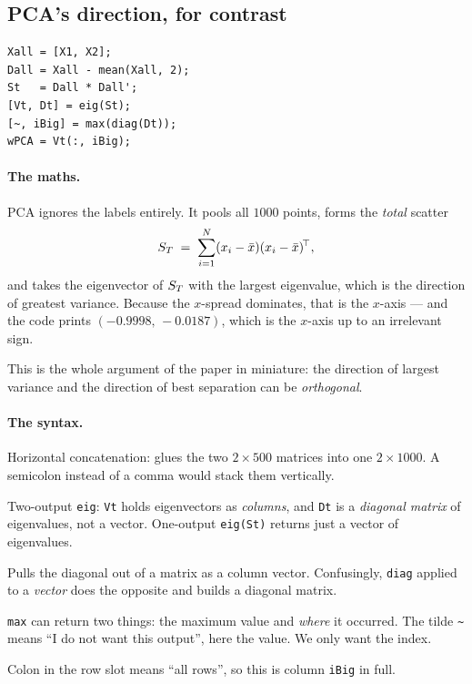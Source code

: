 \subsection{PCA's direction, for contrast}

\begin{lstlisting}
Xall = [X1, X2];
Dall = Xall - mean(Xall, 2);
St   = Dall * Dall';
[Vt, Dt] = eig(St);
[~, iBig] = max(diag(Dt));
wPCA = Vt(:, iBig);
\end{lstlisting}

\paragraph{The maths.} PCA ignores the labels entirely. It pools all $1000$
points, forms the \emph{total} scatter
\[
  S_T \;=\; \sum_{i=1}^{N} (x_i - \bar{x})(x_i - \bar{x})^{\!\top},
\]
and takes the eigenvector of $S_T$ with the largest eigenvalue, which is the
direction of greatest variance. Because the $x$-spread dominates, that is the
$x$-axis --- and the code prints $(-0.9998,\,-0.0187)$, which is the $x$-axis up
to an irrelevant sign.

This is the whole argument of the paper in miniature: the direction of largest
variance and the direction of best separation can be \emph{orthogonal}.

\paragraph{The syntax.}
\begin{description}[leftmargin=*,style=nextline,nosep]
\item[\texttt{[X1, X2]}] Horizontal concatenation: glues the two $2\times500$
  matrices into one $2\times1000$. A semicolon instead of a comma would stack
  them vertically.
\item[\texttt{[Vt, Dt] = eig(St)}] Two-output \texttt{eig}: \texttt{Vt} holds
  eigenvectors as \emph{columns}, and \texttt{Dt} is a \emph{diagonal matrix}
  of eigenvalues, not a vector. One-output \texttt{eig(St)} returns just a
  vector of eigenvalues.
\item[\texttt{diag(Dt)}] Pulls the diagonal out of a matrix as a column vector.
  Confusingly, \texttt{diag} applied to a \emph{vector} does the opposite and
  builds a diagonal matrix.
\item[\texttt{[\textasciitilde, iBig] = max(\ldots)}] \texttt{max} can return
  two things: the maximum value and \emph{where} it occurred. The tilde
  \texttt{\textasciitilde} means ``I do not want this output'', here the value.
  We only want the index.
\item[\texttt{Vt(:, iBig)}] Colon in the row slot means ``all rows'', so this
  is column \texttt{iBig} in full.
\end{description}

